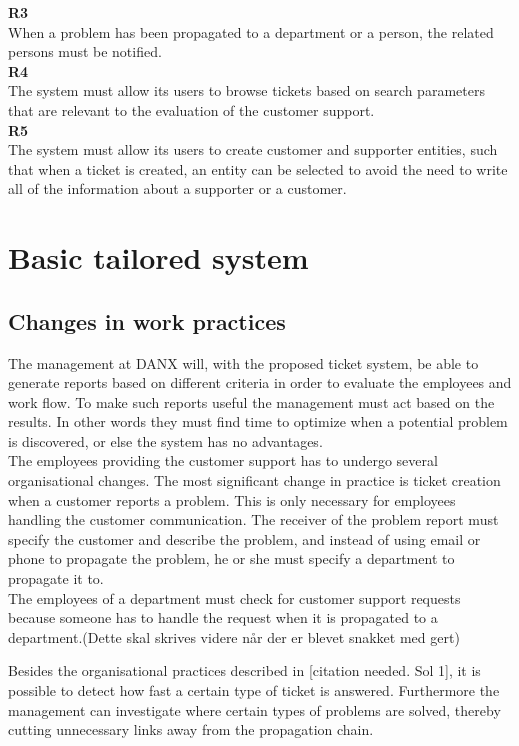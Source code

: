 \textbf{R3} \\
When a problem has been propagated to a department or a person, the related persons must be notified. \\

\textbf{R4} \\
The system must allow its users to browse tickets based on search parameters that are relevant to the evaluation of the customer support. \\

\textbf{R5} \\
The system must allow its users to create customer and supporter entities, such that when a ticket is created, an entity can be selected to avoid the need to write all of the information about a supporter or a customer.

\section{Basic tailored system}
\subsection{Changes in work practices}
The management at DANX will, with the proposed ticket system, be able to generate reports based on different criteria in order to evaluate the employees and work flow. To make such reports useful the management must act based on the results. In other words they must find time to optimize when a potential problem is discovered, or else the system has no advantages.\\
The employees providing the customer support has to undergo several organisational changes. The most significant change in practice is ticket creation when a customer reports a problem. This is only necessary for employees handling the customer communication. The receiver of the problem report must specify the customer and describe the problem, and instead of using email or phone to propagate the problem, he or she must specify a department to propagate it to.\\
The employees of a department must check for customer support requests because someone has to handle the request when it is propagated to a department.(Dette skal skrives videre når der er blevet snakket med gert)

Besides the organisational practices described in [citation needed. Sol 1], it is possible to detect how fast a certain type of ticket is answered. Furthermore the management can investigate where certain types of problems are solved, thereby cutting unnecessary links away from the propagation chain.

